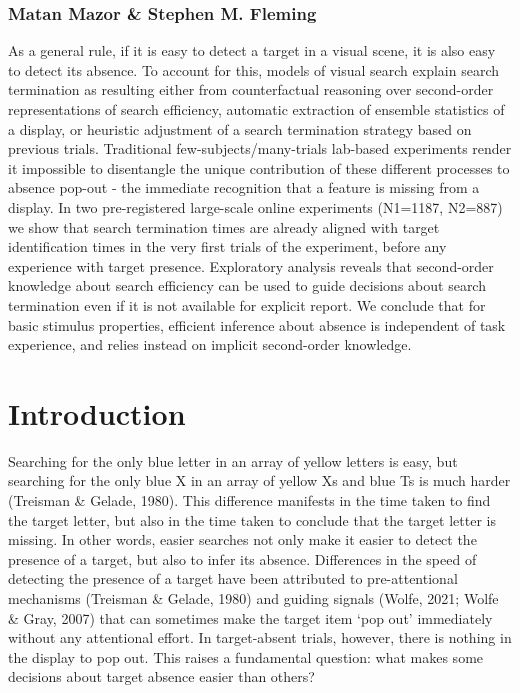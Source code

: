 \documentclass[12pt,twoside]{reedthesis}
\begin{document}
\hypertarget{matan-mazor-stephen-m.-fleming}{%
\subsubsection*{Matan Mazor \& Stephen M. Fleming}\label{matan-mazor-stephen-m.-fleming}}

As a general rule, if it is easy to detect a target in a visual scene, it is also easy to detect its absence. To account for this, models of visual search explain search termination as resulting either from counterfactual reasoning over second-order representations of search efficiency, automatic extraction of ensemble statistics of a display, or heuristic adjustment of a search termination strategy based on previous trials. Traditional few-subjects/many-trials lab-based experiments render it impossible to disentangle the unique contribution of these different processes to absence pop-out - the immediate recognition that a feature is missing from a display. In two pre-registered large-scale online experiments (N1=1187, N2=887) we show that search termination times are already aligned with target identification times in the very first trials of the experiment, before any experience with target presence. Exploratory analysis reveals that second-order knowledge about search efficiency can be used to guide decisions about search termination even if it is not available for explicit report. We conclude that for basic stimulus properties, efficient inference about absence is independent of task experience, and relies instead on implicit second-order knowledge.

\hypertarget{introduction-1}{%
\section{Introduction}\label{introduction-1}}

Searching for the only blue letter in an array of yellow letters is easy, but searching for the only blue X in an array of yellow Xs and blue Ts is much harder (Treisman \& Gelade, 1980). This difference manifests in the time taken to find the target letter, but also in the time taken to conclude that the target letter is missing. In other words, easier searches not only make it easier to detect the presence of a target, but also to infer its absence. Differences in the speed of detecting the presence of a target have been attributed to pre-attentional mechanisms (Treisman \& Gelade, 1980) and guiding signals (Wolfe, 2021; Wolfe \& Gray, 2007) that can sometimes make the target item `pop out' immediately without any attentional effort. In target-absent trials, however, there is nothing in the display to pop out. This raises a fundamental question: what makes some decisions about target absence easier than others?
\end{document}
